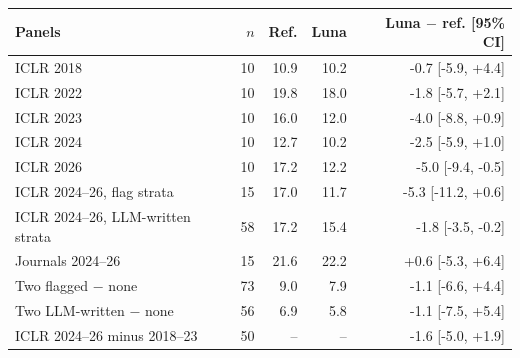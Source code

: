 \begin{tabular}{lrrrr}
\toprule
Panels & $n$ & Ref. & Luna & Luna $-$ ref. [95\% CI] \\
\midrule
ICLR 2018 & 10 & 10.9 & 10.2 & -0.7 [-5.9, +4.4] \\
ICLR 2022 & 10 & 19.8 & 18.0 & -1.8 [-5.7, +2.1] \\
ICLR 2023 & 10 & 16.0 & 12.0 & -4.0 [-8.8, +0.9] \\
ICLR 2024 & 10 & 12.7 & 10.2 & -2.5 [-5.9, +1.0] \\
ICLR 2026 & 10 & 17.2 & 12.2 & -5.0 [-9.4, -0.5] \\
ICLR 2024--26, flag strata & 15 & 17.0 & 11.7 & -5.3 [-11.2, +0.6] \\
ICLR 2024--26, LLM-written strata & 58 & 17.2 & 15.4 & -1.8 [-3.5, -0.2] \\
Journals 2024--26 & 15 & 21.6 & 22.2 & +0.6 [-5.3, +6.4] \\
\midrule
Two flagged $-$ none & 73 & 9.0 & 7.9 & -1.1 [-6.6, +4.4] \\
Two LLM-written $-$ none & 56 & 6.9 & 5.8 & -1.1 [-7.5, +5.4] \\
ICLR 2024--26 minus 2018--23 & 50 & -- & -- & -1.6 [-5.0, +1.9] \\
\bottomrule
\end{tabular}
